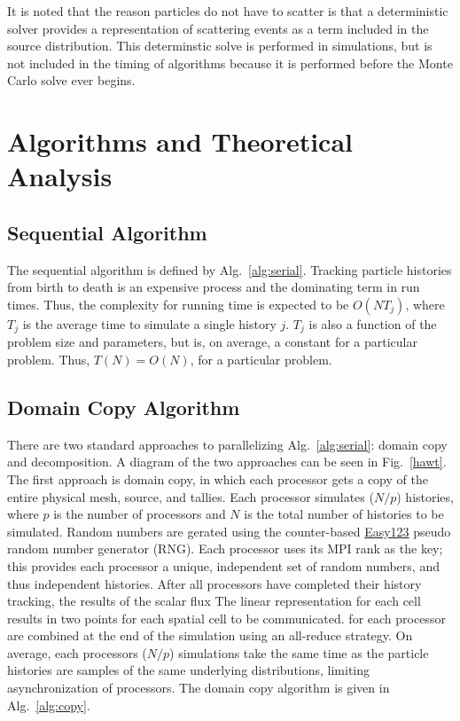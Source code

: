 \documentclass[12pt]{article}
\begin{document}
It is noted that the reason particles do not have to scatter is that a deterministic
solver provides a representation of scattering events as a term included in the
source distribution.  This determinstic solve
is performed in simulations, but is not included in the timing of algorithms because it is
performed before the Monte Carlo solve ever begins.

\section{Algorithms and Theoretical Analysis}

\subsection{Sequential Algorithm}

The sequential algorithm is defined by Alg.~\ref{alg:serial}.  Tracking particle
histories from birth to death is an expensive process and the dominating term in run
times.  Thus, the complexity for running time is expected to be $O(N
T_j)$, where $T_j$ is the average time to simulate a single history $j$.  $T_j$ is
also a function of the problem size and parameters, but is, on average, a constant for a
particular problem.  Thus, $T(N) = O(N)$, for a particular problem.

\subsection{Domain Copy Algorithm}

There are two standard approaches to parallelizing Alg.~\ref{alg:serial}: domain
copy and decomposition.   A diagram of the two approaches can
be seen in Fig.~\ref{hawt}.  The first approach
is domain copy, in which each processor gets a copy of the entire physical mesh,
source, and tallies. Each processor simulates ($N/p$) histories, where $p$ is the
number of processors and $N$ is the total number of histories to be simulated. Random
numbers are gerated using the counter-based
\href{http://www.thesalmons.org/john/random123/papers/random123sc11.pdf}{Easy123}
pseudo random number generator (RNG).  Each processor uses its MPI rank as the key;
this provides each processor a unique, independent set of random numbers, and thus
independent histories.  After all processors have completed their history tracking,
the results of the scalar flux The linear representation for each cell results in two
points for each spatial cell to be communicated.  for each processor are 
combined at the end of the simulation using an all-reduce strategy.  On average, each processors ($N/p$)
simulations take the same time as the particle histories are samples of the same
underlying distributions, limiting
asynchronization of processors.  The domain copy algorithm is given in
Alg.~\ref{alg:copy}.
\end{document}
